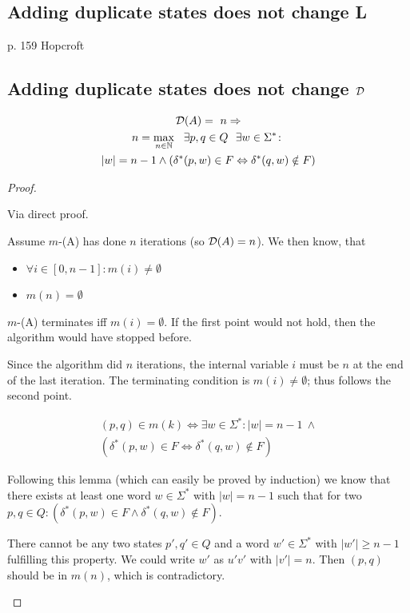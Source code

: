 \subsection{Adding duplicate states does not change L}

p. 159 Hopcroft

\subsection{Adding duplicate states does not change $\mathcal{D}$}

\begin{lemma}
	\begin{multline*}
	\mathcal{D}(A) =\ n \Rightarrow \\
	n = \max_{n \in \mathbb{N}}\ \ \exists p, q \in Q\ \ \exists w \in \Sigma^* \colon \\
	|w| = n - 1 \land (\delta^*(p,w) \in F \Leftrightarrow \delta^*(q,w) \notin F)
	\end{multline*}
\end{lemma}

\begin{proof}
	\begin{description}
		\item
		
		Via direct proof.
		
		Assume $m$-\MinMark(A) has done $n$ iterations (so $\mathcal{D}(A) = n$). We then know, that
		\begin{itemize}
			\item $\forall i \in [0,n-1]\colon m(i) \neq \emptyset$
			\item $m(n)= \emptyset$
		\end{itemize}
		$m$-\MinMark(A) terminates iff $m(i) = \emptyset$. If the first point would not hold, then the algorithm would have stopped before.
		
		Since the algorithm did $n$ iterations, the internal variable $i$ must be $n$ at the end of the last iteration. The terminating condition is $m(i) \neq \emptyset$; thus follows the second point.
		
		\begin{lemma}
			\begin{multline*}
			(p,q) \in m(k) \Longleftrightarrow 
			\exists w\in\Sigma^*\colon |w| = n - 1\ \land \\
			(\delta^*(p,w) \in F \Leftrightarrow \delta^*(q,w) \notin F)
			\end{multline*}
		\end{lemma}
		
		Following this lemma (which can easily be proved by induction) we know that there exists at least one word $w\in\Sigma^*$ with $|w| = n-1$ such that for two $p,q \in Q\colon (\delta^*(p,w) \in F \land \delta^*(q,w) \notin F)$.
		
		There cannot be any two states $p',q'\in Q$ and a word $w'\in\Sigma^*$ with $|w'| \ge n-1$ fulfilling this property. We could write $w'$ as $u'v'$ with $|v'| = n$. Then $(p,q)$ should be in $m(n)$, which is contradictory.
	\end{description}
\end{proof}

